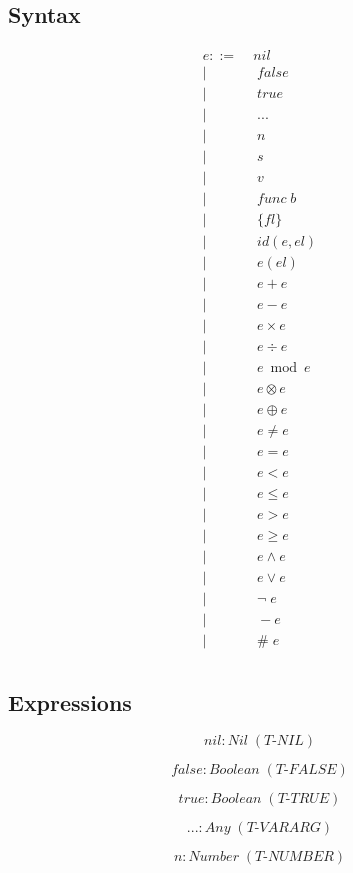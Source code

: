 \documentclass[12pt]{article}
\begin{document}
\subsection{Syntax}

\begin{align*}
e ::= \; & nil\\
| & \; false\\
| & \; true\\
| & \; {...}\\
| & \; n\\
| & \; s\\
| & \; v\\
| & \; func \; b\\
| & \; \{fl\}\\
| & \; id(e,el)\\
| & \; e(el)\\
| & \; e + e\\
| & \; e - e\\
| & \; e \times e\\
| & \; e \div e\\
| & \; e \bmod e\\
| & \; e \otimes e\\
| & \; e \oplus e\\
| & \; e \not= e\\
| & \; e = e\\
| & \; e < e\\
| & \; e \le e\\
| & \; e > e\\
| & \; e \ge e\\
| & \; e \land e\\
| & \; e \lor e\\
| & \; \lnot \; e\\
| & \; - e\\
| & \; \# \; e\\
\end{align*}

\subsection{Expressions}

\[
nil : Nil \; (\textit{T-NIL})
\]

\[
false : Boolean \; (\textit{T-FALSE})
\]

\[
true : Boolean \; (\textit{T-TRUE})
\]

\[
{...} : Any \; (\textit{T-VARARG})
\]

\[
n : Number \; (\textit{T-NUMBER})
\]
\end{document}
